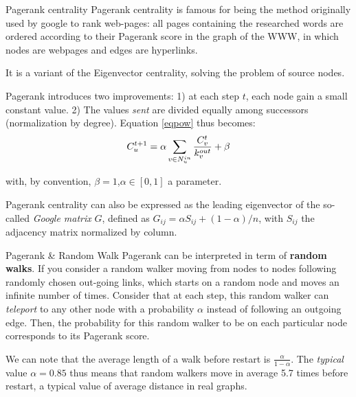 \begin{textbox}{Pagerank centrality}
    Pagerank centrality is famous for being the method originally used by google to rank web-pages: all pages containing the researched words are ordered according to their Pagerank score in the graph of the WWW, in which nodes are webpages and edges are hyperlinks.

    It is a variant of the Eigenvector centrality, solving the problem of source nodes.

    Pagerank introduces two improvements: 1) at each step $t$, each node gain a small constant value. 2) The values \textit{sent} are divided equally among successors (normalization by degree). Equation \ref{eqpow} thus becomes:
    \begin{equation}
        \centering
        C^{t+1}_u = \alpha \sum_{v\in N^{in}_u} \frac{C^t_v}{k^{out}_v} + \beta
    \end{equation}

    with, by convention, $\beta=1$,$\alpha \in [0,1]$ a parameter.

    Pagerank centrality can also be expressed as the leading eigenvector of the so-called \textit{Google matrix} $G$, defined as $G_{ij} = \alpha S_{ij} + (1- \alpha)/n$, with $S_{ij}$ the adjacency matrix normalized by column.
\end{textbox}


\begin{textbox}{Pagerank \& Random Walk}
    Pagerank can be interpreted in term of \textbf{random walks}. If you consider a random walker moving from nodes to nodes following randomly chosen out-going links, which starts on a random node and moves an infinite number of times. Consider that at each step, this random walker can \textit{teleport} to any other node with a probability $\alpha$ instead of following an outgoing edge. Then, the probability for this random walker to be on each particular node corresponds to its Pagerank score.

    We can note that the average length of a walk before restart is $\frac{\alpha}{1-\alpha}$. The \textit{typical} value $\alpha=0.85$ thus means that random walkers move in average 5.7 times before restart, a typical value of average distance in real graphs.
\end{textbox}




